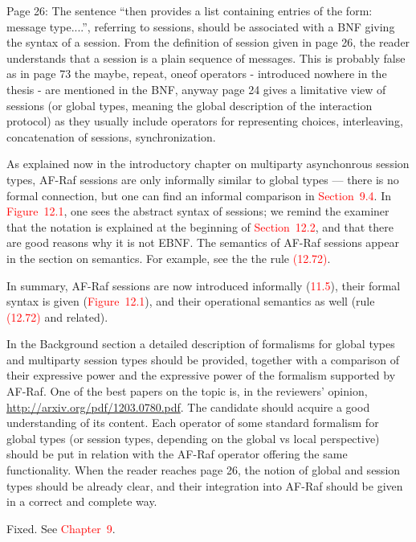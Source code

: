 \documentclass{article}
\newcommand*\R[1]{\textcolor{red}{#1}} %
\newenvironment{them}{\noindent\begingroup\color{blue}}{\endgroup\par}
\begin{document}
\begin{them}

Page 26:
The sentence “then provides a list containing entries of the form: message
type....”, referring to sessions, should be associated with a BNF giving the
syntax of a session. From the definition of session given in page 26, the
reader understands that a session is a plain sequence of messages. This is
probably false as in page 73 the maybe, repeat, oneof operators - introduced
nowhere in the thesis - are mentioned in the BNF, anyway page 24 gives a
limitative view of sessions (or global types, meaning the global description of
the interaction protocol) as they usually include operators for representing
choices, interleaving, concatenation of sessions, synchronization. 

\end{them}

As explained now in the introductory chapter on multiparty asynchonrous session
types, AF-Raf sessions are only informally similar to global types --- there is
no formal connection, but one can find an informal comparison in
\R{Section~9.4}. In \R{Figure~12.1}, one sees the abstract syntax of sessions;
we remind the examiner that the notation is explained at the beginning of
\R{Section~12.2}, and that there are good reasons why it is not EBNF.  The
semantics of AF-Raf sessions appear in the section on semantics.  For example,
see the the rule \R{(12.72)}.

In summary,
  AF-Raf sessions are now introduced informally (\R{11.5}),
  their formal syntax is given (\R{Figure~12.1}),
  and their operational semantics as well (rule \R{(12.72)} and related).


\begin{them}

In the Background section a detailed description of formalisms for global types
and multiparty session types should be provided, together with a comparison of
their expressive power and the expressive power of the formalism supported by
AF-Raf. One of the best papers on the topic is, in the reviewers' opinion,
\url{http://arxiv.org/pdf/1203.0780.pdf}. The candidate should acquire a good
understanding of its content. Each operator of some standard formalism for
global types (or session types, depending on the global vs local perspective)
should be put in relation with the AF-Raf operator offering the same
functionality. When the reader reaches page 26, the notion of global and
session types should be already clear, and their integration into AF-Raf should
be given in a correct and complete way.

\end{them}
Fixed. See \R{Chapter~9}.
\end{document}
